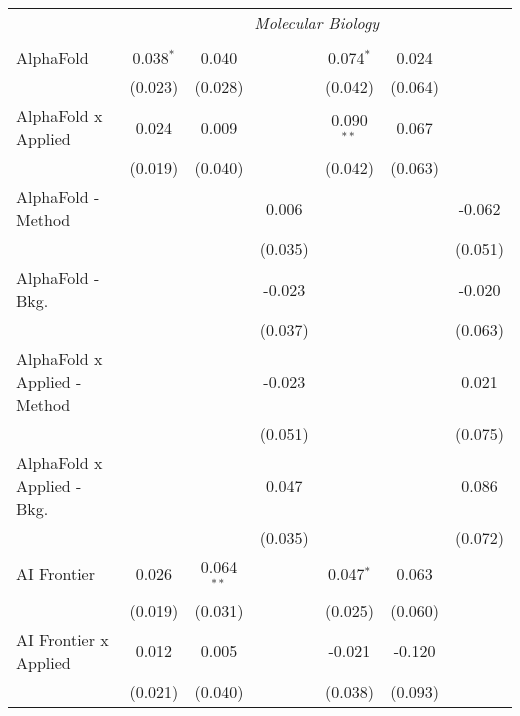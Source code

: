 \begin{tabular}{lcccccc}
 & \multicolumn{6}{c}{\textit{Molecular Biology}} \\ \\
   AlphaFold                      & 0.038$^{*}$  & 0.040        &               & 0.074$^{*}$  & 0.024   &   \\   
                                  & (0.023)      & (0.028)      &               & (0.042)      & (0.064) &   \\   
   AlphaFold x Applied            & 0.024        & 0.009        &               & 0.090$^{**}$ & 0.067   &   \\   
                                  & (0.019)      & (0.040)      &               & (0.042)      & (0.063) &   \\   
   AlphaFold - Method             &              &              & 0.006         &              &         & -0.062\\   
                                  &              &              & (0.035)       &              &         & (0.051)\\   
   AlphaFold - Bkg.               &              &              & -0.023        &              &         & -0.020\\   
                                  &              &              & (0.037)       &              &         & (0.063)\\   
   AlphaFold x Applied - Method   &              &              & -0.023        &              &         & 0.021\\   
                                  &              &              & (0.051)       &              &         & (0.075)\\   
   AlphaFold x Applied - Bkg.     &              &              & 0.047         &              &         & 0.086\\   
                                  &              &              & (0.035)       &              &         & (0.072)\\   
   AI Frontier                    & 0.026        & 0.064$^{**}$ &               & 0.047$^{*}$  & 0.063   &   \\   
                                  & (0.019)      & (0.031)      &               & (0.025)      & (0.060) &   \\   
   AI Frontier x Applied          & 0.012        & 0.005        &               & -0.021       & -0.120  &   \\   
                                  & (0.021)      & (0.040)      &               & (0.038)      & (0.093) &   \\   

\end{tabular}

